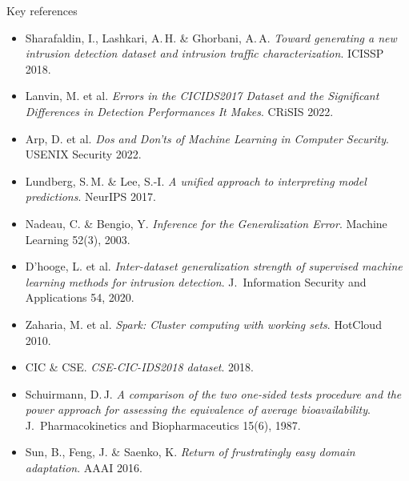 \documentclass[aspectratio=169, 11pt]{beamer}
\begin{document}
\begin{frame}{Key references}
  \begin{itemize}\scriptsize
    \setlength{\itemsep}{0.1em}
    \item[{[1]}] Sharafaldin, I., Lashkari, A.\,H. \& Ghorbani, A.\,A.
          \emph{Toward generating a new intrusion detection dataset and
          intrusion traffic characterization}. ICISSP 2018.
          \hfill{}
    \item[{[2]}] Lanvin, M. et al. \emph{Errors in the CICIDS2017 Dataset and the
          Significant Differences in Detection Performances It Makes}.
          CRiSIS 2022.
          \hfill{}
    \item[{[3]}] Arp, D. et al. \emph{Dos and Don'ts of Machine Learning in Computer
          Security}. USENIX Security 2022.
          \hfill{}
    \item[{[4]}] Lundberg, S.\,M. \& Lee, S.-I. \emph{A unified approach to
          interpreting model predictions}. NeurIPS 2017.
          \hfill{}
    \item[{[5]}] Nadeau, C. \& Bengio, Y. \emph{Inference for the Generalization
          Error}. Machine Learning 52(3), 2003.
          \hfill{}
    \item[{[6]}] D'hooge, L. et al. \emph{Inter-dataset generalization strength of
          supervised machine learning methods for intrusion detection}.
          J.\ Information Security and Applications 54, 2020.
          \hfill{}
    \item[{[7]}] Zaharia, M. et al. \emph{Spark: Cluster computing with working
          sets}. HotCloud 2010.
          \hfill{}
    \item[{[8]}] CIC \& CSE. \emph{CSE-CIC-IDS2018 dataset}. 2018.
          \hfill{}
    \item[{[9]}] Schuirmann, D.\,J. \emph{A comparison of the two one-sided tests
          procedure and the power approach for assessing the equivalence of
          average bioavailability}. J.\ Pharmacokinetics and
          Biopharmaceutics 15(6), 1987.
          \hfill{}
    \item[{[10]}] Sun, B., Feng, J. \& Saenko, K. \emph{Return of frustratingly
          easy domain adaptation}. AAAI 2016.
          \hfill{}
  \end{itemize}
\end{frame}
\end{document}
